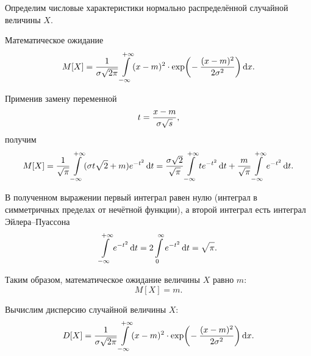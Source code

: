 \documentclass[a4paper]{article}
\DeclareMathOperator{\exp}{exp}
\newcommand{\sqrtt}[1]{\sqrt{\vphantom{qb} #1}}
\begin{document}
                    Определим числовые характеристики нормально распределённой случайной величины $X$.
                    
                    Математическое ожидание
                    \begin{equation*}
                        M[X] = \frac{1}{\sigma \sqrtt{2 \pi}}
                            \int\limits_{-\infty}^{+\infty} (x - m)^2 \cdot
                            \exp \! \bigg( \! -\frac{(x - m)^2}{2 \sigma^2} \bigg) \dif x .
                    \end{equation*}

                    Применив замену переменной
                    \begin{equation*}
                        t = \frac{x - m}{\sigma \sqrtt{s}} ,
                    \end{equation*}
                    получим
                    \begin{equation*}
                        M[X] = \frac{1}{\sqrtt{\pi}}
                            \int\limits_{-\infty}^{+\infty} (\sigma t \sqrtt{2} + m)
                            e^{-t^2} \dif t =
                            \frac{\sigma \sqrtt{2}}{\sqrtt{\pi}}
                            \int\limits_{-\infty}^{+\infty} t e^{-t^2} \dif t +
                            \frac{m}{\sqrtt{\pi}}
                            \int\limits_{-\infty}^{+\infty} e^{-t^2} \dif t .
                    \end{equation*}

                    В полученном выражении первый интеграл равен нулю (интеграл в симметричных пределах от нечётной функции), а второй интеграл есть интеграл Эйлера--Пуассона
                    \begin{equation*}
                        \int\limits_{-\infty}^{+\infty} e^{-t^2} \dif t =
                        2 \int\limits_{0}^{\infty} e^{-t^2} \dif t = \sqrtt{\pi} .
                    \end{equation*}

                    Таким образом, математическое ожидание величины $X$ равно $m$:
                    \begin{equation*}
                        M[X] = m .
                    \end{equation*}

                    Вычислим дисперсию случайной величины $X$:
                    \begin{equation*}
                        D[X] = \frac{1}{\sigma \sqrtt{2 \pi}}
                        \int\limits_{-\infty}^{+\infty} (x - m)^2 \cdot
                            \exp \! \bigg( \! -\frac{(x - m)^2}{2 \sigma^2} \bigg) \dif x .
                    \end{equation*}
\end{document}
